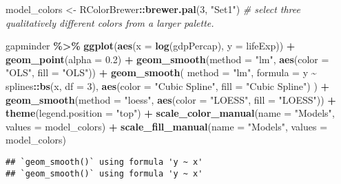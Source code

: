 \documentclass[
]{book}
\newenvironment{Shaded}{\begin{snugshade}}{\end{snugshade}}
\newcommand{\CommentTok}[1]{\textcolor[rgb]{0.56,0.35,0.01}{\textit{#1}}}
\newcommand{\DataTypeTok}[1]{\textcolor[rgb]{0.13,0.29,0.53}{#1}}
\newcommand{\DecValTok}[1]{\textcolor[rgb]{0.00,0.00,0.81}{#1}}
\newcommand{\FloatTok}[1]{\textcolor[rgb]{0.00,0.00,0.81}{#1}}
\newcommand{\KeywordTok}[1]{\textcolor[rgb]{0.13,0.29,0.53}{\textbf{#1}}}
\newcommand{\NormalTok}[1]{#1}
\newcommand{\OperatorTok}[1]{\textcolor[rgb]{0.81,0.36,0.00}{\textbf{#1}}}
\newcommand{\StringTok}[1]{\textcolor[rgb]{0.31,0.60,0.02}{#1}}
\begin{document}
\begin{Shaded}
\begin{Highlighting}[]
\NormalTok{model\_colors \textless{}{-}}\StringTok{ }\NormalTok{RColorBrewer}\OperatorTok{::}\KeywordTok{brewer.pal}\NormalTok{(}\DecValTok{3}\NormalTok{, }\StringTok{"Set1"}\NormalTok{) }\CommentTok{\# select three qualitatively different colors from a larger palette.}

\NormalTok{gapminder }\OperatorTok{\%\textgreater{}\%}
\StringTok{  }\KeywordTok{ggplot}\NormalTok{(}\KeywordTok{aes}\NormalTok{(}\DataTypeTok{x =} \KeywordTok{log}\NormalTok{(gdpPercap), }\DataTypeTok{y =}\NormalTok{ lifeExp)) }\OperatorTok{+}
\StringTok{  }\KeywordTok{geom\_point}\NormalTok{(}\DataTypeTok{alpha =} \FloatTok{0.2}\NormalTok{) }\OperatorTok{+}
\StringTok{  }\KeywordTok{geom\_smooth}\NormalTok{(}\DataTypeTok{method =} \StringTok{"lm"}\NormalTok{, }\KeywordTok{aes}\NormalTok{(}\DataTypeTok{color =} \StringTok{"OLS"}\NormalTok{, }\DataTypeTok{fill =} \StringTok{"OLS"}\NormalTok{)) }\OperatorTok{+}
\StringTok{  }\KeywordTok{geom\_smooth}\NormalTok{(}
    \DataTypeTok{method =} \StringTok{"lm"}\NormalTok{, }\DataTypeTok{formula =}\NormalTok{ y }\OperatorTok{\textasciitilde{}}\StringTok{ }\NormalTok{splines}\OperatorTok{::}\KeywordTok{bs}\NormalTok{(x, }\DataTypeTok{df =} \DecValTok{3}\NormalTok{),}
    \KeywordTok{aes}\NormalTok{(}\DataTypeTok{color =} \StringTok{"Cubic Spline"}\NormalTok{, }\DataTypeTok{fill =} \StringTok{"Cubic Spline"}\NormalTok{)}
\NormalTok{  ) }\OperatorTok{+}
\StringTok{  }\KeywordTok{geom\_smooth}\NormalTok{(}\DataTypeTok{method =} \StringTok{"loess"}\NormalTok{, }\KeywordTok{aes}\NormalTok{(}\DataTypeTok{color =} \StringTok{"LOESS"}\NormalTok{, }\DataTypeTok{fill =} \StringTok{"LOESS"}\NormalTok{)) }\OperatorTok{+}
\StringTok{  }\KeywordTok{theme}\NormalTok{(}\DataTypeTok{legend.position =} \StringTok{"top"}\NormalTok{) }\OperatorTok{+}
\StringTok{  }\KeywordTok{scale\_color\_manual}\NormalTok{(}\DataTypeTok{name =} \StringTok{"Models"}\NormalTok{, }\DataTypeTok{values =}\NormalTok{ model\_colors) }\OperatorTok{+}
\StringTok{  }\KeywordTok{scale\_fill\_manual}\NormalTok{(}\DataTypeTok{name =} \StringTok{"Models"}\NormalTok{, }\DataTypeTok{values =}\NormalTok{ model\_colors)}
\end{Highlighting}
\end{Shaded}

\begin{verbatim}
## `geom_smooth()` using formula 'y ~ x'
## `geom_smooth()` using formula 'y ~ x'
\end{verbatim}
\end{document}
